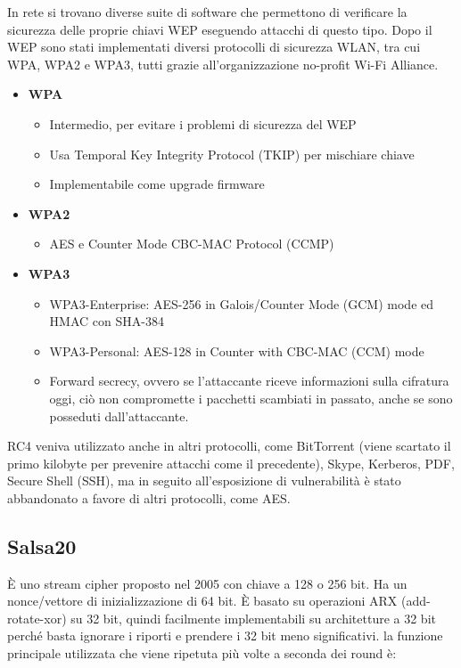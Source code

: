 In rete si trovano diverse suite di software che permettono di verificare la sicurezza delle proprie chiavi WEP eseguendo attacchi di questo tipo. Dopo il WEP sono stati implementati diversi protocolli di sicurezza WLAN, tra cui WPA, WPA2 e WPA3, tutti grazie all'organizzazione no-profit Wi-Fi Alliance.

\begin{itemize}
    \item \textbf{WPA}
    \begin{itemize}
        \item Intermedio, per evitare i problemi di sicurezza del WEP
        \item Usa Temporal Key Integrity Protocol (TKIP) per mischiare chiave
        \item Implementabile come upgrade firmware
    \end{itemize}
    \item \textbf{WPA2}
    \begin{itemize}
        \item AES e Counter Mode CBC-MAC Protocol (CCMP)
    \end{itemize}
    \item \textbf{WPA3}
    \begin{itemize}
        \item WPA3-Enterprise: AES-256 in Galois/Counter Mode (GCM)
mode ed HMAC con SHA-384
        \item WPA3-Personal: AES-128 in Counter with CBC-MAC (CCM) mode
        \item Forward secrecy, ovvero se l'attaccante riceve informazioni sulla cifratura oggi, ciò non compromette i pacchetti scambiati in passato, anche se sono posseduti dall'attaccante. 
    \end{itemize}
\end{itemize}

RC4 veniva utilizzato anche in altri protocolli, come BitTorrent (viene scartato il primo kilobyte per prevenire attacchi come il precedente), Skype, Kerberos, PDF, Secure Shell (SSH), ma in seguito all'esposizione di vulnerabilità è stato abbandonato a favore di altri protocolli, come AES. 

\subsection{Salsa20}
È uno stream cipher proposto nel 2005 con chiave a 128 o 256 bit. Ha un nonce/vettore di inizializzazione di 64 bit. È basato su operazioni ARX (add-rotate-xor) su 32 bit, quindi facilmente implementabili su architetture a 32 bit perché basta ignorare i riporti e prendere i 32 bit meno significativi. la funzione principale utilizzata che viene ripetuta più volte a seconda dei round è:

